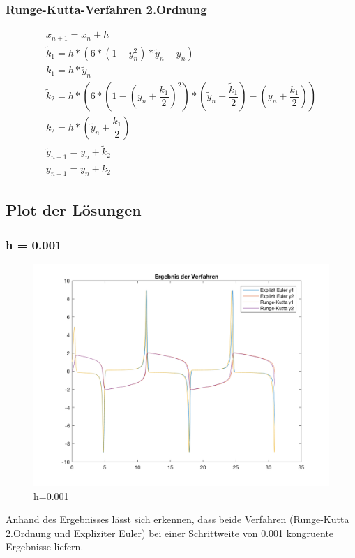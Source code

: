\documentclass[]{scrartcl}
\begin{document}
\subsubsection{Runge-Kutta-Verfahren 2.Ordnung}
\begin{align}
x_{n+1} = x_{n}+h \\
\tilde{k}_{1} = h * (6 * (1 - y_{n}^{2}) * \tilde{y}_{n} - y_{n}) \\
k_{1} = h * \tilde{y}_{n} \\
\tilde{k}_{2} = h * (6 * (1 - (y_{n} + \dfrac{k_{1}}{2})^{2}) * (\tilde{y}_{n} + \dfrac{\tilde{k}_{1}}{2}) - (y_{n} + \dfrac{k_{1}}{2})) \\
k_{2} = h * (\tilde{y}_{n} + \dfrac{k_{1}}{2}) \\
\tilde{y}_{n+1} = \tilde{y}_{n}+\tilde{k}_{2} \\
y_{n+1} = y_{n}+k_{2}
\end{align}

\subsection{Plot der Lösungen}
\subsubsection{h = 0.001}
\begin{figure}[H]
\centering
\includegraphics[width=1\linewidth]{a1_2_1}
\caption{h=0.001}
\label{fig:a1_2_1}
\end{figure}

Anhand des Ergebnisses lässt sich erkennen, dass beide Verfahren (Runge-Kutta 2.Ordnung und Expliziter Euler) bei einer Schrittweite von 0.001 kongruente Ergebnisse liefern.
\end{document}

